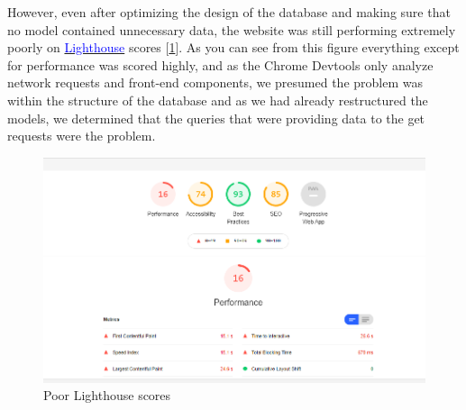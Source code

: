 However, even after optimizing the design of the database and making sure that no model contained unnecessary data, the website was still performing extremely poorly on \href{https://developers.google.com/web/tools/lighthouse/}{\textcolor{blue}{Lighthouse}} scores [\ref{fig:poor_lighthouse}]. As you can see from this figure everything except for performance was scored highly, and as the Chrome Devtools only analyze network requests and front-end components, we presumed the problem was within the structure of the database and as we had already restructured the models, we determined that the queries that were providing data to the get requests were the problem.

\begin{figure}[H]
  \centering
  \includegraphics[scale=0.65]{img/lighthouse_poor_cropped.jpg}
  \caption{Poor Lighthouse scores}
  \label{fig:poor_lighthouse}
\end{figure}

